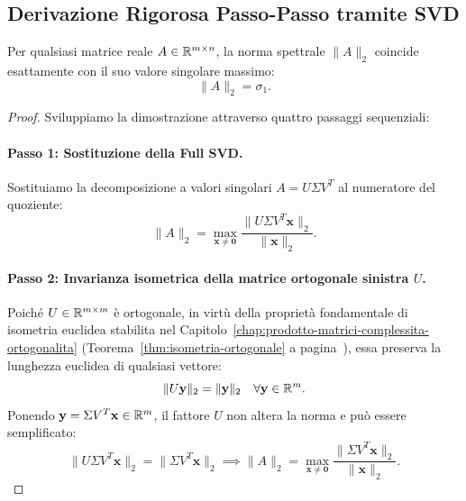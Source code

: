 \subsection{Derivazione Rigorosa Passo-Passo tramite SVD}

\begin{theorem}
\label{thm:norma-spettrale-sigma1}
Per qualsiasi matrice reale $A \in \mathbb{R}^{m \times n}$, la norma spettrale $\|A\|_2$ coincide esattamente con il suo valore singolare massimo:
\begin{equation}
    \|A\|_2 = \sigma_1.
\end{equation}
\end{theorem}

\begin{proof}
Sviluppiamo la dimostrazione attraverso quattro passaggi sequenziali:

\paragraph{Passo 1: Sostituzione della Full SVD.}
Sostituiamo la decomposizione a valori singolari $A = U \Sigma V^T$ al numeratore del quoziente:
\begin{equation}
    \|A\|_2 = \max_{\mathbf{x} \neq \mathbf{0}} \frac{\|U \Sigma V^T \mathbf{x}\|_2}{\|\mathbf{x}\|_2}.
\end{equation}

\paragraph{Passo 2: Invarianza isometrica della matrice ortogonale sinistra $U$.}
Poich\'e $U \in \mathbb{R}^{m \times m}$ \`e ortogonale, in virt\`u della propriet\`a fondamentale di isometria euclidea stabilita nel Capitolo~\ref{chap:prodotto-matrici-complessita-ortogonalita} (Teorema~\ref{thm:isometria-ortogonale} a pagina~\pageref{thm:isometria-ortogonale}), essa preserva la lunghezza euclidea di qualsiasi vettore:
\begin{equation}
    \|U \mathbf{y}\|_2 = \|\mathbf{y}\|_2 \quad \forall \mathbf{y} \in \mathbb{R}^m.
\end{equation}
Ponendo $\mathbf{y} = \Sigma V^T \mathbf{x} \in \mathbb{R}^m$, il fattore $U$ non altera la norma e pu\`o essere semplificato:
\begin{equation}
    \|U \Sigma V^T \mathbf{x}\|_2 = \|\Sigma V^T \mathbf{x}\|_2 \implies \|A\|_2 = \max_{\mathbf{x} \neq \mathbf{0}} \frac{\|\Sigma V^T \mathbf{x}\|_2}{\|\mathbf{x}\|_2}.
\end{equation}


\end{proof}
